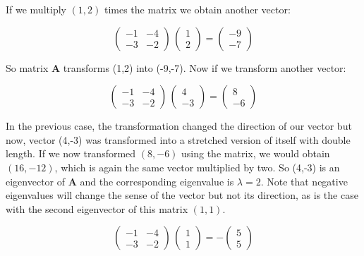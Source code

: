 \documentclass{tufte-book} %
\begin{document}
If we multiply $(1,2)$ times the matrix we obtain another vector:

\begin{equation}
	 \begin{pmatrix} -1 & -4\\ -3 & -2\end{pmatrix} \,  \begin{pmatrix} 1\\ 2\end{pmatrix}=\begin{pmatrix} -9 \\ -7\end{pmatrix}\nonumber
\end{equation}

So matrix $\mathbf{A}$ transforms  (1,2) into  (-9,-7). Now if  we transform another vector:

\begin{equation}
	\begin{pmatrix} -1 & -4\\ -3 & -2\end{pmatrix} \,  \begin{pmatrix} 4\\ -3\end{pmatrix}=\begin{pmatrix} 8 \\ -6\end{pmatrix}\nonumber
\end{equation}

In the previous case, the transformation changed the direction of our vector but now, vector (4,-3) was transformed into a stretched version of itself with double length. If we now transformed $(8,-6)$ using the matrix, we would obtain $(16,-12)$, which is again the same vector multiplied by two. So (4,-3) is an eigenvector of $\mathbf{A}$ and the corresponding eigenvalue is $\lambda=2$. Note that negative eigenvalues will change the sense of the vector but not its direction, as is the case with the second eigenvector of this matrix $(1,1)$.

\begin{equation}
	\begin{pmatrix} -1 & -4\\ -3 & -2\end{pmatrix} \,  \begin{pmatrix} 1\\ 1\end{pmatrix}=- \begin{pmatrix} 5 \\ 5\end{pmatrix}\nonumber
\end{equation}
\end{document}
